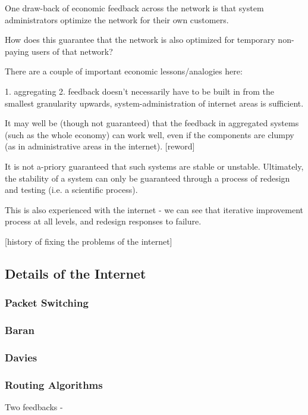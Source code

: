 One draw-back of economic feedback across the network is that system administrators optimize the
network for their own customers.

How does this guarantee that the network is also optimized for temporary non-paying users of that
network?



There are a couple of important economic lessons/analogies here:

1. aggregating    
2. feedback doesn't necessarily have to be built in from the smallest granularity upwards,
   system-administration of internet areas is sufficient.

It may well be (though not guaranteed) that the feedback in aggregated systems (such as the whole
economy) can work well, even if the components are clumpy (as in administrative areas in the
internet). [reword]

It is not a-priory guaranteed that such systems are stable or unstable. Ultimately, the stability of
a system can only be guaranteed through a process of redesign and testing (i.e. a scientific
process).

This is also experienced with the internet - we can see that iterative improvement process at all
levels, and redesign responses to failure.

[history of fixing the problems of the internet]

\subsection{Details of the Internet}


\subsubsection{Packet Switching}

\subsubsection{Baran}
\subsubsection{Davies}

\subsubsection{Routing Algorithms}

Two feedbacks - 

